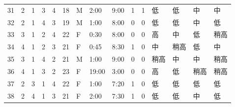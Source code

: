 \begin{table}[htbp]
{\begin{tabular}{lllllllllllllll}
31                  & 2                      & 1                       & 3                      & 4                       & 18                     & M                   & 2:00                  & 9:00                  & 1                    & 1                    & 低       & 低       & 中    & 中  \\
32                  & 2                      & 1                       & 4                      & 3                       & 19                     & M                   & 1:00                  & 8:00                  & 0                    & 0                    & 低       & 低       & 中    & 低  \\
33                  & 3                      & 1                       & 2                      & 4                       & 22                     & F                   & 0:30                  & 8:00                  & 0                    & 0                    & 高       & 中       & 低    & 稍高 \\
34                  & 4                      & 1                       & 2                      & 3                       & 21                     & F                   & 0:45                  & 8:30                  & 1                    & 0                    & 中       & 稍高      & 低    & 中  \\
35                  & 3                      & 1                       & 4                      & 2                       & 21                     & M                   & 1:00                  & 9:00                  & 0                    & 0                    & 稍高      & 中       & 中    & 稍高 \\
36                  & 4                      & 1                       & 3                      & 2                       & 23                     & F                   & 19:00                 & 3:00                  & 0                    & 0                    & 高       & 低       & 稍高   & 稍高 \\
37                  & 2                      & 3                       & 1                      & 4                       & 22                     & F                   & 1:00                  & 7:20                  & 1                    & 0                    & 低       & 低       & 低    & 低  \\
38                  & 2                      & 4                       & 1                      & 3                       & 21                     & F                   & 2:00                  & 7:30                  & 1                    & 0                    & 低       & 低       & 中    & 低  \\

\end{tabular}}
\end{table}
